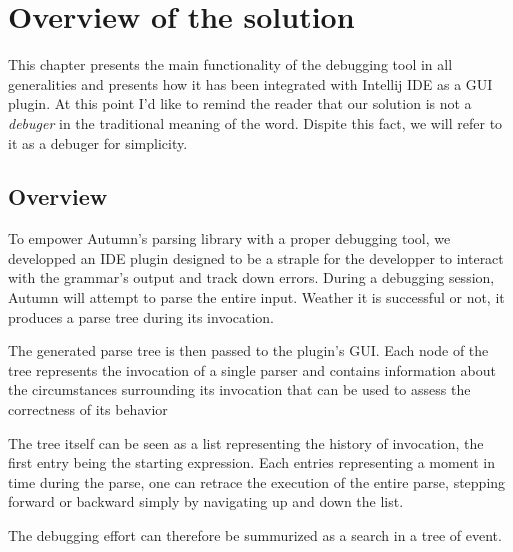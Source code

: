 %
\chapter{Overview of the solution}
%
This chapter presents the main functionality of the debugging tool in all generalities and presents how it has been integrated with Intellij IDE as a GUI plugin. At this point I'd like to remind the reader that our solution is not a \textit{debuger} in the traditional meaning of the word. Dispite this fact, we will refer to it as a debuger for simplicity. 

\section{Overview}
To empower Autumn's parsing library with a proper debugging tool, we developped an IDE plugin designed to be a straple for the developper to interact with the grammar's output and track down errors. During a debugging session, Autumn will attempt to parse the entire input. Weather it is successful or not, it produces a parse tree during its invocation.

\bigskip

The generated parse tree is then passed to the plugin's GUI. Each node of the tree represents the invocation of a single parser and contains information about the circumstances surrounding its invocation that can be used to assess the correctness of its behavior

\bigskip

The tree itself can be seen as a list representing the history of invocation, the first entry being the starting expression. Each entries representing a moment in time during the parse, one can retrace the execution of the entire parse, stepping forward or backward simply by navigating up and down the list. 

\bigskip

The debugging effort can therefore be summurized as a search in a tree of event.


